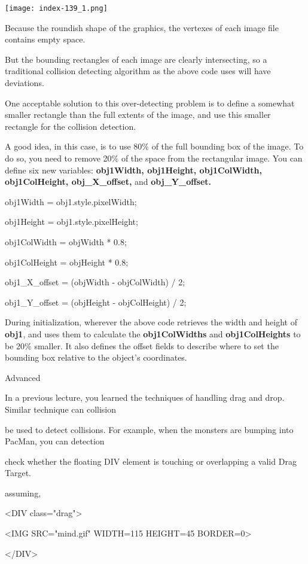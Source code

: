 \documentclass[
]{article}
\begin{document}
\protect\hypertarget{index_split_009.htmlux5cux23p139}{}{}\texttt{[image: index-139\_1.png]}

Because the roundish shape of the graphics, the vertexes of each image
file contains empty space.

But the bounding rectangles of each image are clearly intersecting, so a
traditional collision detecting algorithm as the above code uses will
have deviations.

One acceptable solution to this over-detecting problem is to define a
somewhat smaller rectangle than the full extents of the image, and use
this smaller rectangle for the collision detection.

A good idea, in this case, is to use 80\% of the full bounding box of
the image. To do so, you need to remove 20\% of the space from the
rectangular image. You can define six new variables: \textbf{obj1Width,
obj1Height, obj1ColWidth, obj1ColHeight, obj\_X\_offset,} and
\textbf{obj\_Y\_offset.}

obj1Width = obj1.style.pixelWidth;

obj1Height = obj1.style.pixelHeight;

obj1ColWidth = objWidth * 0.8;

obj1ColHeight = objHeight * 0.8;

obj1\_X\_offset = (objWidth - objColWidth) / 2;

obj1\_Y\_offset = (objHeight - objColHeight) / 2;

During initialization, wherever the above code retrieves the width and
height of \textbf{obj1}, and uses them to calculate the
\textbf{obj1ColWidths} and \textbf{obj1ColHeights} to be 20\% smaller.
It also defines the offset fields to describe where to set the bounding
box relative to the object's coordinates.

Advanced

In a previous lecture, you learned the techniques of handling drag and
drop. Similar technique can collision

be used to detect collisions. For example, when the monsters are bumping
into PacMan, you can detection

check whether the floating DIV element is touching or overlapping a
valid Drag Target.

assuming,

\textless DIV class="drag"\textgreater{}

\textless IMG SRC="mind.gif" WIDTH=115 HEIGHT=45 BORDER=0\textgreater{}

\textless/DIV\textgreater{}
\end{document}
